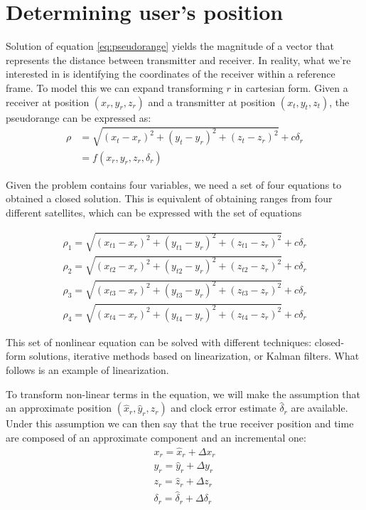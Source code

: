 \section{Determining user's position}
Solution of equation \ref{eq:pseudorange} yields the magnitude of a vector that
represents the distance between transmitter and receiver. In reality, what we're
interested in is identifying the coordinates of the receiver within a reference
frame. To model this we can expand transforming $r$ in cartesian form. Given a
receiver at position $(x_r, y_r, z_r)$ and a transmitter at position $(x_t, y_t,
z_t)$, the pseudorange can be expressed as:
\begin{equation} \label{eq:expandedpseudorange}
  \begin{aligned}
    \rho &= \sqrt{(x_t - x_r)^2 + (y_t - y_r)^2 + (z_t - z_r)^2} + c\delta_r \\
    & = f(x_r, y_r, z_r, \delta_r)
  \end{aligned}
\end{equation}

Given the problem contains four variables, we need a set of four equations to
obtained a closed solution. This is equivalent of obtaining ranges from four
different satellites, which can be expressed with the set of equations

\begin{equation} \label{eq:userpositionfull}
  \begin{array}{l}
  \rho_1 = \sqrt{(x_{t1} - x_r)^2 + (y_{t1} - y_r)^2 + (z_{t1} - z_r)^2} + c\delta_r \\
  \rho_2 = \sqrt{(x_{t2} - x_r)^2 + (y_{t2} - y_r)^2 + (z_{t2} - z_r)^2} + c\delta_r \\
  \rho_3 = \sqrt{(x_{t3} - x_r)^2 + (y_{t3} - y_r)^2 + (z_{t3} - z_r)^2} + c\delta_r \\
  \rho_4 = \sqrt{(x_{t4} - x_r)^2 + (y_{t4} - y_r)^2 + (z_{t4} - z_r)^2} + c\delta_r
  \end{array}
\end{equation}

This set of nonlinear equation can be solved with different techniques:
closed-form solutions, iterative methods based on linearization, or Kalman
filters. What follows is an example of linearization.

\par

To transform non-linear terms in the equation, we will make the assumption that
an approximate position $(\hat x_r, \hat y_r, \hat z_r)$ and clock error
estimate $\hat \delta_r$ are available. Under this assumption we can then say
that the true receiver position and time are composed of an approximate
component and an incremental one:
\begin{equation} \label{eq:incrementals}
  \begin{array}{l}
    x_r = \hat x_r + \Delta x_r \\
    y_r = \hat y_r + \Delta y_r \\
    z_r = \hat z_r + \Delta z_r \\
    \delta_r = \hat \delta_r + \Delta \delta_r
  \end{array}
\end{equation}

